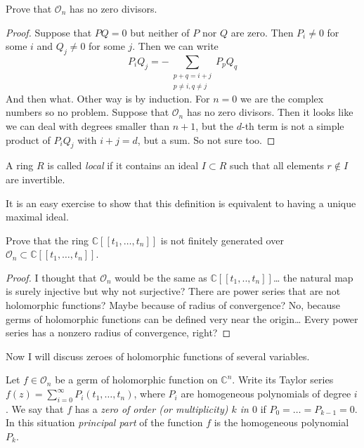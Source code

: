 \begin{exercise}
\label{exercise-stalk-has-no-zero-divisors}
Prove that $\mathcal{O}_n$ has no zero divisors.
\end{exercise}

\begin{proof}
Suppose that $PQ=0$ but neither of $P$ nor $Q$ are zero. Then $P_i \neq 0$ for
some $i$ and $Q_j \neq 0$ for some $j$. Then we can write
$$
P_iQ_j=-\sum_{\substack{p+q=i+j \\ p\neq i,q\neq j}}P_pQ_q
$$
And then what. Other way is by induction. For $n=0$ we are the complex numbers
so no problem. Suppose that $\mathcal{O}_n$ has no zero divisors. Then it looks
like we can deal with degrees smaller than $n+1$, but the $d$-th term is not a
simple product of $P_iQ_j$ with $i+j=d$, but a sum. So not sure too.
\end{proof}

\begin{definition}
\label{definition-local-ring}
A ring $R$ is called {\it local} if it contains an ideal $I\subset R$ such that
all elements $r \not \in I$ are invertible.
\end{definition}

It is an easy exercise to show that this definition is equivalent to having a
unique maximal ideal.

\begin{exercise}
\label{exercise-power-series-is-not-finitely-generated-over-stalk}
Prove that the ring $\mathbb{C}[\![ t_1,\ldots,t_n]\!]$ is not
finitely generated over $\mathcal{O}_n \subset 
\mathbb{C}[\![ t_1,\ldots,t_n]\!]$.
\end{exercise}

\begin{proof}
I thought that $\mathcal{O}_n$ would be the same as 
$\mathbb{C}[\![ t_1,..,t_n]\!]$… the natural map is surely injective
but why not surjective? There are power series that are not holomorphic
functions? Maybe because of radius of convergence? No, because germs of
holomorphic functions can be defined very near the origin… Every power series
has a nonzero radius of convergence, right?
\end{proof}

\noindent
Now I will discuss zeroes of holomorphic functions of several variables.

\begin{definition}
\label{definition-zero-of-holomorphic-function-of-several-variables}
Let  $f\in \mathcal{O}_n$ be a germ of holomorphic function on $\mathbb{C}^n$.
Write its Taylor series $f(z)=\sum_{i=0}^\infty P_i(t_1,\ldots,t_n)$, where
$P_i$ are homogeneous polynomials of degree $i$. We say that $f$ has a {\it
zero of order (or multiplicity) $k$ in $0$} if $P_0=\ldots=P_{k-1}=0$. In this
situation {\it principal part} of the function $f$ is the homogeneous polynomial
$P_k$.
\end{definition}

